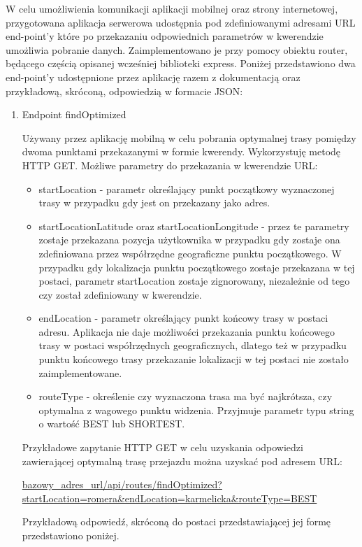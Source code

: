 W celu umożliwienia komunikacji aplikacji mobilnej oraz strony internetowej, przygotowana aplikacja serwerowa udostępnia pod zdefiniowanymi adresami URL end-point’y które po przekazaniu odpowiednich parametrów w kwerendzie umożliwia pobranie danych. Zaimplementowano je przy pomocy obiektu router, będącego częścią opisanej wcześniej biblioteki express.
Poniżej przedstawiono dwa end-point’y udostępnione przez aplikację razem z dokumentacją oraz przykładową, skróconą, odpowiedzią w formacie JSON:
\begin{enumerate}
\item Endpoint findOptimized

Używany przez aplikację mobilną w celu pobrania optymalnej trasy pomiędzy dwoma punktami przekazanymi w formie kwerendy. Wykorzystuję metodę HTTP GET. Możliwe parametry do przekazania w kwerendzie URL:

\begin{itemize}
\item startLocation - parametr określający punkt początkowy wyznaczonej trasy w przypadku gdy jest on przekazany jako adres.
\item startLocationLatitude oraz startLocationLongitude - przez te parametry zostaje przekazana pozycja użytkownika w przypadku gdy zostaje ona zdefiniowana przez współrzędne geograficzne punktu początkowego. W przypadku gdy lokalizacja punktu początkowego zostaje przekazana w tej postaci, parametr startLocation zostaje zignorowany, niezależnie od tego czy został zdefiniowany w kwerendzie.
\item endLocation - parametr określający punkt końcowy trasy w postaci adresu. Aplikacja nie daje możliwości przekazania punktu końcowego trasy w postaci współrzędnych geograficznych, dlatego też w przypadku punktu końcowego trasy przekazanie lokalizacji w tej postaci nie zostało zaimplementowane.
\item routeType - określenie czy wyznaczona trasa ma być najkrótsza, czy optymalna z wagowego punktu widzenia. Przyjmuje parametr typu string o wartość BEST lub SHORTEST.
\end{itemize}

Przykładowe zapytanie HTTP GET w celu uzyskania odpowiedzi zawierającej optymalną trasę przejazdu można uzyskać pod adresem URL:

\url{bazowy_adres_url/api/routes/findOptimized?startLocation=romera&endLocation=karmelicka&routeType=BEST}

Przykładową odpowiedź, skróconą do postaci przedstawiającej jej formę przedstawiono poniżej.


\end{enumerate}
